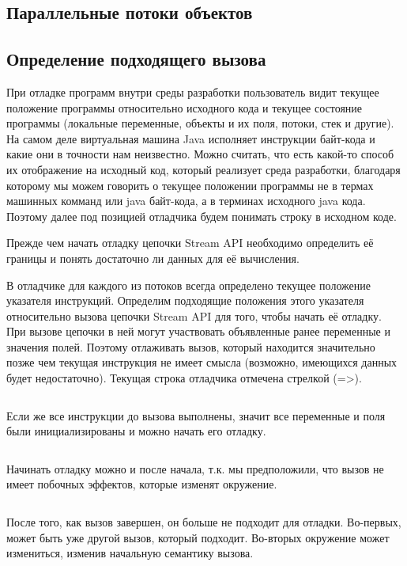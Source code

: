 \subsection{Параллельные потоки объектов}


\subsection{Определение подходящего вызова}
При отладке программ внутри среды разработки пользователь видит текущее положение программы относительно исходного кода и текущее состояние программы (локальные переменные, объекты и их поля, потоки, стек и другие). На самом деле виртуальная машина Java исполняет инструкции байт-кода и какие они в точности нам неизвестно. Можно считать, что есть какой-то способ их отображение на исходный код, который реализует среда разработки, благодаря которому мы можем говорить о текущее положении программы не в термах машинных комманд или java байт-кода, а в терминах исходного java кода. Поэтому далее под позицией отладчика будем понимать строку в исходном коде.

Прежде чем начать отладку цепочки Stream API необходимо определить её границы и понять достаточно ли данных для её вычисления.

В отладчике для каждого из потоков всегда определено текущее положение указателя инструкций. Определим подходящие положения этого указателя относительно вызова цепочки Stream API для того, чтобы начать её отладку. При вызове цепочки в ней могут участвовать объявленные ранее переменные и значения полей. Поэтому отлаживать вызов, который находится значительно позже чем текущая инструкция не имеет смысла (возможно, имеющихся данных будет недостаточно). Текущая строка отладчика отмечена стрелкой (=>).

\inputminted{java}{chapter2/code/FarToCall.java}

Если же все инструкции до вызова выполнены, значит все переменные и поля были инициализированы и можно начать его отладку. 

\inputminted{java}{chapter2/code/BeforeCall.java}

Начинать отладку можно и после начала, т.к. мы предположили, что вызов не имеет побочных эффектов, которые изменят окружение.
\inputminted{java}{chapter2/code/InEvaluation.java}

После того, как вызов завершен, он больше не подходит для отладки. Во-первых, может быть уже другой вызов, который подходит. Во-вторых окружение может измениться, изменив начальную семантику вызова.
\inputminted{java}{chapter2/code/AfterCall.java}

